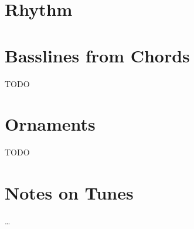 
\section{Rhythm}
\begin{center}
\end{center}

\section{Basslines from Chords}
TODO

\section{Ornaments}
TODO

\section{Notes on Tunes}
\begin{description}[noitemsep]
\item[TODO] \dots
\end{description}


